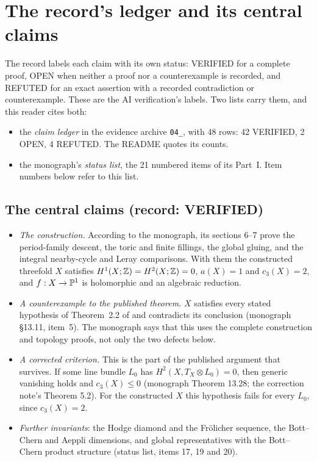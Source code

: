 \section{The record's ledger and its central claims}\label{sec:ledger}

The record labels each claim with its own status: \textsf{VERIFIED} for a complete proof, \textsf{OPEN} when neither a proof nor a counterexample is recorded, and \textsf{REFUTED} for an exact assertion with a recorded contradiction or counterexample. These are the AI verification's labels. Two lists carry them, and this reader cites both:
\begin{itemize}
\item the \emph{claim ledger} in the evidence archive \texttt{04\_}, with 48 rows: 42 \textsf{VERIFIED}, 2 \textsf{OPEN}, 4 \textsf{REFUTED}. The README quotes its counts.
\item the monograph's \emph{status list}, the 21 numbered items of its Part~I. Item numbers below refer to this list.
\end{itemize}

\subsection{The central claims (record: \textsf{VERIFIED})}

\begin{itemize}
\item \emph{The construction.} According to the monograph, its sections 6--7 prove the period-family descent, the toric and finite fillings, the global gluing, and the integral nearby-cycle and Leray comparisons. With them the constructed threefold $X$ satisfies $H^1(X;\mathbb{Z})=H^2(X;\mathbb{Z})=0$, $a(X)=1$ and $c_3(X)=2$, and $f:X\to\mathbb{P}^1$ is holomorphic and an algebraic reduction.
\item \emph{A counterexample to the published theorem.} $X$ satisfies every stated hypothesis of Theorem~2.2 of \cite{CDP20} and contradicts its conclusion (monograph §13.11, item~5). The monograph says that this uses the complete construction and topology proofs, not only the two defects below.
\item \emph{A corrected criterion.} This is the part of the published argument that survives. If some line bundle $L_0$ has $H^2(X,T_X\otimes L_0)=0$, then generic vanishing holds and $c_3(X)\le0$ (monograph Theorem 13.28; the correction note's Theorem 5.2). For the constructed $X$ this hypothesis fails for every $L_0$, since $c_3(X)=2$.
\item \emph{Further invariants}: the Hodge diamond and the Frölicher sequence, the Bott--Chern and Aeppli dimensions, and global representatives with the Bott--Chern product structure (status list, items 17, 19 and 20).
\end{itemize}

